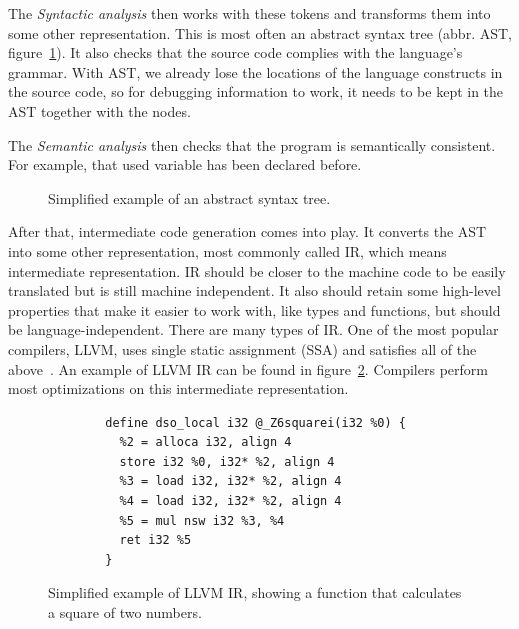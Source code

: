 The \textit{Syntactic analysis} then works with these tokens and transforms
them into some other representation. This is most often an abstract syntax tree
(abbr. AST, figure~\ref{fig:ast}). It also checks that the source code complies
with the language's grammar. With AST, we already lose the locations of the
language constructs in the source code, so for debugging information to work,
it needs to be kept in the AST together with the nodes.

The \textit{Semantic analysis} then checks that the program is semantically
consistent. For example, that used variable has been declared before.

\begin{figure}
    \centering
    \caption{Simplified example of an abstract syntax tree.}
    \label{fig:ast}
\end{figure}
 
After that, intermediate code generation comes into play. It converts the AST
into some other representation, most commonly called IR, which means
intermediate representation. IR should be closer to the machine code to be
easily translated but is still machine independent. It also should retain some
high-level properties that make it easier to work with, like types and
functions, but should be language-independent. There are many types of IR. One
of the most popular compilers, LLVM, uses single static assignment (SSA) and
satisfies all of the above~\cite{llvm}. An example of LLVM IR can be found in
figure~\ref{fig:llvm-ir-example}. Compilers perform most optimizations on this
intermediate representation. 

\begin{figure}
    \begin{verbatim}
        define dso_local i32 @_Z6squarei(i32 %0) {
          %2 = alloca i32, align 4
          store i32 %0, i32* %2, align 4
          %3 = load i32, i32* %2, align 4
          %4 = load i32, i32* %2, align 4
          %5 = mul nsw i32 %3, %4
          ret i32 %5
        }
    \end{verbatim}
    \caption{Simplified example of LLVM IR, showing a function that calculates
    a square of two numbers.}
    \label{fig:llvm-ir-example}
\end{figure}

